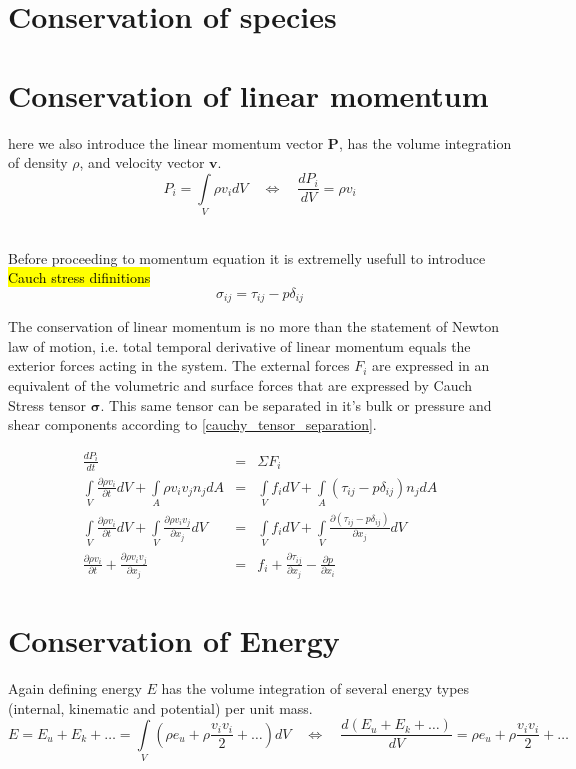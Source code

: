\section{Conservation of species}


\section{Conservation of linear momentum}
here we also introduce the linear momentum vector $\mathbf{P}$, has the volume integration of density $\rho$, and velocity vector $\mathbf{v}$.
\begin{equation}
P_i=\int\limits_V\rho v_i dV \quad  \Leftrightarrow \quad  \frac{dP_i}{dV}= \rho v_i
\end{equation}\

Before proceeding to momentum equation it is extremelly usefull to introduce \hl{Cauch stress difinitions}
\begin{equation}
    \label{cauchy_tensor_separation}
    \sigma_{ij} = \tau_{ij} - p \delta_{ij}  
\end{equation}

The conservation of linear momentum is no more than the statement of Newton law of motion, i.e. total temporal derivative of linear momentum equals the exterior forces acting in the system. The external forces  $F_i$ are expressed in  an equivalent of the volumetric and surface forces that are expressed by Cauch Stress tensor $\boldsymbol \sigma$. This same tensor can be separated in it's bulk or pressure and shear components according to \eqref{cauchy_tensor_separation}.  

\begin{eqnarray}
    \frac{dP_i}{dt} &=& \Sigma F_i \\
    \int\limits_V\frac{\partial \rho v_i}{\partial t} dV +  \int\limits_A \rho v_i v_j n_j dA &=& \int\limits_V f_i dV + \int\limits_A (\tau_{ij}- p \delta_{ij} ) n_j dA \\ 
    \int\limits_V\frac{\partial \rho v_i}{\partial t} dV +  \int\limits_V \frac{\partial \rho v_i v_j}{\partial x_j} dV  &=& \int\limits_V f_i dV + \int\limits_V \frac{\partial (\tau_{ij}- p \delta_{ij} )}{\partial x_j} dV \\ 
    \frac{\partial \rho v_i}{\partial t} +  \frac{\partial \rho v_i v_j}{\partial x_j} &=& f_i + \frac{\partial \tau_{ij}}{\partial x_j} - \frac{\partial p}{\partial x_i} 
\end{eqnarray}


\section{Conservation of Energy}
Again defining energy $E$ has the volume integration of several energy types (internal, kinematic and potential) per unit mass.
\begin{equation}
E= E_u + E_k + \ldots =\int\limits_V (\rho e_u+ \rho\frac{v_i v_i}{2} + \ldots) dV \quad  \Leftrightarrow \quad  \frac{d(E_u + E_k + \ldots) }{dV} = \rho e_u+ \rho\frac{v_i v_i}{2} + \ldots  
\end{equation}


